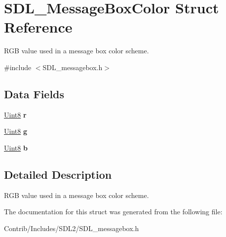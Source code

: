 \hypertarget{struct_s_d_l___message_box_color}{}\section{S\+D\+L\+\_\+\+Message\+Box\+Color Struct Reference}
\label{struct_s_d_l___message_box_color}


R\+GB value used in a message box color scheme.  




{\ttfamily \#include $<$S\+D\+L\+\_\+messagebox.\+h$>$}

\subsection*{Data Fields}
\begin{DoxyCompactItemize}
\item 
\hyperlink{_s_d_l__stdinc_8h_a2944638813a090aa23e62f4da842c3e2}{Uint8} {\bfseries r}\hypertarget{struct_s_d_l___message_box_color_a91b464c8eae5ece8465e150e16086acd}{}\label{struct_s_d_l___message_box_color_a91b464c8eae5ece8465e150e16086acd}

\item 
\hyperlink{_s_d_l__stdinc_8h_a2944638813a090aa23e62f4da842c3e2}{Uint8} {\bfseries g}\hypertarget{struct_s_d_l___message_box_color_ab4c6f97b95a6d0a8058a62eab9c78c43}{}\label{struct_s_d_l___message_box_color_ab4c6f97b95a6d0a8058a62eab9c78c43}

\item 
\hyperlink{_s_d_l__stdinc_8h_a2944638813a090aa23e62f4da842c3e2}{Uint8} {\bfseries b}\hypertarget{struct_s_d_l___message_box_color_a3d03a0372246e40434fc7a8a928c1e92}{}\label{struct_s_d_l___message_box_color_a3d03a0372246e40434fc7a8a928c1e92}

\end{DoxyCompactItemize}


\subsection{Detailed Description}
R\+GB value used in a message box color scheme. 

The documentation for this struct was generated from the following file\+:\begin{DoxyCompactItemize}
\item 
Contrib/\+Includes/\+S\+D\+L2/S\+D\+L\+\_\+messagebox.\+h\end{DoxyCompactItemize}
